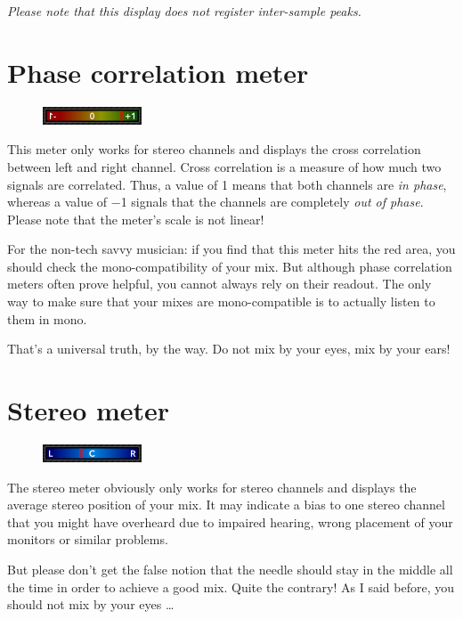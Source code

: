 \emph{Please note that this display does not register inter-sample
  peaks.}

\section{Phase correlation meter}

\begin{figure}
\includegraphics[scale=\screenshotscale,clip]{include/images/phase_correlation_meter.png}
\end{figure}

This meter only works for stereo channels and displays the cross
correlation between left and right channel.  Cross correlation is a
measure of how much two signals are correlated.  Thus, a value of
\num[retainplus]{+1} means that both channels are \emph{in phase},
whereas a value of \num{-1} signals that the channels are completely
\emph{out of phase}.  Please note that the meter's scale is not
linear!

For the non-tech savvy musician: if you find that this meter hits the
red area, you should check the mono-compatibility of your mix.  But
although phase correlation meters often prove helpful, you cannot
always rely on their readout.  The only way to make sure that your
mixes are mono-compatible is to actually listen to them in mono.

That's a universal truth, by the way.  Do not mix by your eyes, mix by
your ears!

\section{Stereo meter}

\begin{figure}
\includegraphics[scale=\screenshotscale,clip]{include/images/stereo_meter.png}
\end{figure}

The stereo meter obviously only works for stereo channels and displays
the average stereo position of your mix.  It may indicate a bias to
one stereo channel that you might have overheard due to impaired
hearing, wrong placement of your monitors or similar problems.

But please don't get the false notion that the needle should stay in
the middle all the time in order to achieve a good mix.  Quite the
contrary!  As I said before, you should not mix by your eyes \dots

